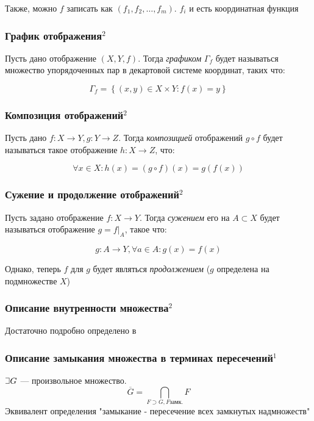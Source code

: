 \documentclass{article}
\def\letus{%
\mathord{\setbox0=\hbox{$\exists$}%
         \hbox{\kern 0.125\wd0%
               \vbox to \ht0{%
                  \hrule width 0.75\wd0%
                  \vfill%
                  \hrule width 0.75\wd0}%
               \vrule height \ht0%
               \kern 0.125\wd0}%
       }%
        }
\begin{document}
Также, можно $f$ записать как $(f_1, f_2, \ldots, f_m)$. $f_i$ и есть координатная функция

\subsubsection{График отображения\texorpdfstring{$^2$}{}}

Пусть дано отображение $(X, Y, f)$. Тогда \textit{графиком} $\Gamma_f$ будет называться множество упорядоченных пар в декартовой системе координат, таких что:

\[\Gamma_f = \left\{(x, y) \in X \times Y : f(x) = y \right\}\]

\subsubsection{Композиция отображений\texorpdfstring{$^2$}{}}

Пусть дано $f: X \rightarrow Y, g: Y \rightarrow Z$. Тогда \textit{композицией} отображений $g \circ f$ будет называться такое отображение $h: X \rightarrow Z$, что:

\[\forall x \in X : h(x) = (g \circ f)(x) = g(f(x))\]

\subsubsection{Сужение и продолжение отображений\texorpdfstring{$^2$}{}}

Пусть задано отображение $f: X \rightarrow Y$. Тогда \textit{сужением}
его на $A \subset X$ будет называться отображение $g = f|_A$, такое что:

\[g: A \rightarrow Y, \forall a \in A : g(x) = f(x)\]

Однако, теперь $f$ для $g$ будет являться \textit{продолжением} ($g$ определена на подмножестве $X$)

\subsubsection{Описание внутренности множества\texorpdfstring{$^2$}{}}
Достаточно подробно определено в\\ 

\subsubsection{Описание замыкания множества в терминах пересечений\texorpdfstring{$^1$}{}}
$\letus G$ --- произвольное множество.
$$
\overline{G} = \underset{F\supset G, F \text{замк.}}{\bigcap} F
$$
Эквивалент определения "замыкание - пересечение всех замкнутых надмножеств"
\end{document}

